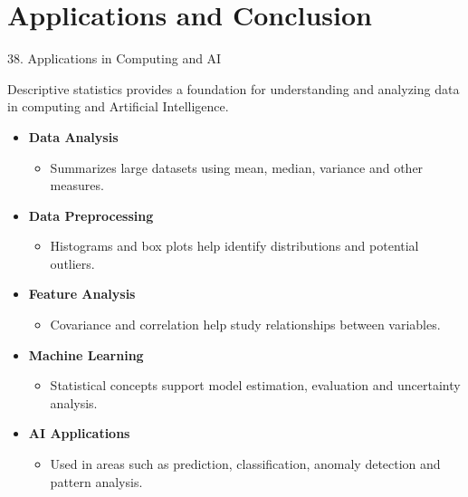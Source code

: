 
\section{Applications and Conclusion}


\begin{frame}{38. Applications in Computing and AI}

Descriptive statistics provides a foundation for understanding
and analyzing data in computing and Artificial Intelligence.

\vspace{0.3cm}

\begin{itemize}

    \item \textbf{Data Analysis}
    \begin{itemize}
        \item Summarizes large datasets using mean, median, variance and other measures.
    \end{itemize}

    \item \textbf{Data Preprocessing}
    \begin{itemize}
        \item Histograms and box plots help identify distributions and potential outliers.
    \end{itemize}

    \item \textbf{Feature Analysis}
    \begin{itemize}
        \item Covariance and correlation help study relationships between variables.
    \end{itemize}

    \item \textbf{Machine Learning}
    \begin{itemize}
        \item Statistical concepts support model estimation, evaluation and uncertainty analysis.
    \end{itemize}

    \item \textbf{AI Applications}
    \begin{itemize}
        \item Used in areas such as prediction, classification, anomaly detection and pattern analysis.
    \end{itemize}

\end{itemize}

\end{frame}


